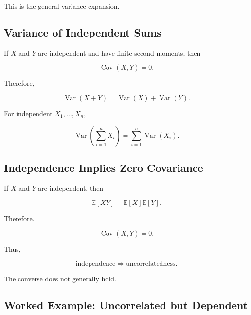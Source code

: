This is the general variance expansion.

\subsection{Variance of Independent Sums}
\label{subsec:variance-independent-sums}

If \(X\) and \(Y\) are independent and have finite second moments, then

\[
\operatorname{Cov}(X,Y)=0.
\]

Therefore,

\[
\boxed{
\operatorname{Var}(X+Y)
=
\operatorname{Var}(X)
+
\operatorname{Var}(Y).
}
\]

For independent \(X_1,\ldots,X_n\),

\[
\boxed{
\operatorname{Var}
\left(
\sum_{i=1}^{n}X_i
\right)
=
\sum_{i=1}^{n}
\operatorname{Var}(X_i).
}
\]

\subsection{Independence Implies Zero Covariance}
\label{subsec:independence-zero-covariance}

If \(X\) and \(Y\) are independent, then

\[
\mathbb{E}[XY]
=
\mathbb{E}[X]
\mathbb{E}[Y].
\]

Therefore,

\[
\boxed{
\operatorname{Cov}(X,Y)=0.
}
\]

Thus,

\[
\boxed{
\text{independence}
\Longrightarrow
\text{uncorrelatedness}.
}
\]

The converse does not generally hold.

\subsection{Worked Example: Uncorrelated but Dependent}
\label{subsec:worked-uncorrelated-dependent}

